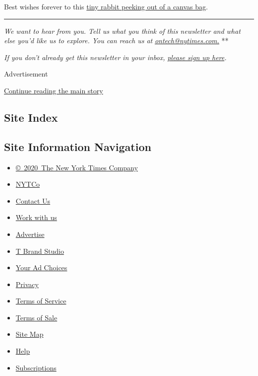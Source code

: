Best wishes forever to this
\href{https://www.tiktok.com/@carrot.castle/video/6847954959464434949}{tiny
rabbit peeking out of a canvas bag}.

\begin{center}\rule{0.5\linewidth}{\linethickness}\end{center}

\emph{We want to hear from you. Tell us what you think of this
newsletter and what else you'd like us to explore. You can reach us at}
\href{mailto:ontech@nytimes.com?subject=On\%20Tech\%20Feedback}{\emph{ontech@nytimes.com.}}
**

\emph{If you don't already get this newsletter in your inbox,}
\href{https://www.nytimes.com/newsletters/signup/OT}{\emph{please sign
up here}}\emph{.}

Advertisement

\protect\hyperlink{after-bottom}{Continue reading the main story}

\hypertarget{site-index}{%
\subsection{Site Index}\label{site-index}}

\hypertarget{site-information-navigation}{%
\subsection{Site Information
Navigation}\label{site-information-navigation}}

\begin{itemize}
\tightlist
\item
  \href{https://help.nytimes.com/hc/en-us/articles/115014792127-Copyright-notice}{©~2020~The
  New York Times Company}
\end{itemize}

\begin{itemize}
\tightlist
\item
  \href{https://www.nytco.com/}{NYTCo}
\item
  \href{https://help.nytimes.com/hc/en-us/articles/115015385887-Contact-Us}{Contact
  Us}
\item
  \href{https://www.nytco.com/careers/}{Work with us}
\item
  \href{https://nytmediakit.com/}{Advertise}
\item
  \href{http://www.tbrandstudio.com/}{T Brand Studio}
\item
  \href{https://www.nytimes.com/privacy/cookie-policy\#how-do-i-manage-trackers}{Your
  Ad Choices}
\item
  \href{https://www.nytimes.com/privacy}{Privacy}
\item
  \href{https://help.nytimes.com/hc/en-us/articles/115014893428-Terms-of-service}{Terms
  of Service}
\item
  \href{https://help.nytimes.com/hc/en-us/articles/115014893968-Terms-of-sale}{Terms
  of Sale}
\item
  \href{https://spiderbites.nytimes.com}{Site Map}
\item
  \href{https://help.nytimes.com/hc/en-us}{Help}
\item
  \href{https://www.nytimes.com/subscription?campaignId=37WXW}{Subscriptions}
\end{itemize}
